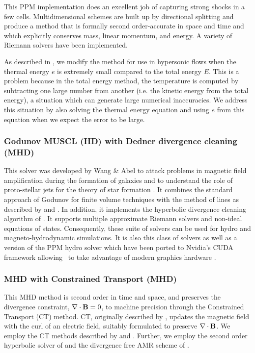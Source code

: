 This PPM implementation does an excellent job of capturing strong
shocks in a few cells.  Multidimensional schemes are built up by
directional splitting and produce a method that is formally second
order-accurate in space and time and which explicitly conserves mass,
linear momentum, and energy.    A variety of 
Riemann solvers have been implemented.  

As described in \citet{Bryan95}, we modify the method for use in
hypersonic flows when the thermal energy $e$ is extremely small
compared to the total energy $E$.  This is a problem because in the
total energy method, the temperature is computed by subtracting one
large number from another (i.e. the kinetic energy from the total
energy), a situation which can generate large numerical inaccuracies.
We address this situation by also solving the thermal energy equation
and using $e$ from this equation when we expect the error to be large.


\subsubsection{Godunov MUSCL (HD) with Dedner divergence cleaning (MHD)}
This solver was developed by Wang \& Abel to attack problems in
magnetic field amplification during the formation of galaxies
\citep{Wang:2009a} and to understand the role of proto-stellar jets for
the theory of star formation \citep{Wang:2009b}. It combines the standard
approach of Godunov \citep{Godunov1959} for finite volume techniques
with the method of lines as described by
\cite{leveque2002finite} and \cite{toro-1997}. In addition, 
it implements the hyperbolic divergence cleaning algorithm of
\cite{2002JCoPh.175..645D}. It supports multiple approximate Riemann
solvers and non-ideal equations of states. Consequently,
these suite of solvers can be used for hydro and magneto-hydrodynamic
simulations. It is also this class of solvers as well as a version of
the PPM hydro solver which have been ported to Nvidia's CUDA framework
allowing \enzo\ to take advantage of modern graphics hardware \citep{Wang:2010}.

\subsubsection{MHD with Constrained Transport (MHD)}
This MHD method is second order in time and space, and preserves the divergence constraint,
$\nabla \cdot \mathbf{B} = 0$, to machine precision through the Constrained Transport
(CT) method.  CT, originally described by \citet{Evans88}, updates the
magnetic field with the curl of an electric field, suitably formulated to
preserve $\nabla \cdot \mathbf{B}$.  We employ the CT methods
described by \citet{Balsara99} and \citet{Gardiner05}.  Further, we employ the
second order hyperbolic solver of \citet{Li08a} and the divergence free AMR
scheme of \citet{Balsara01}.


